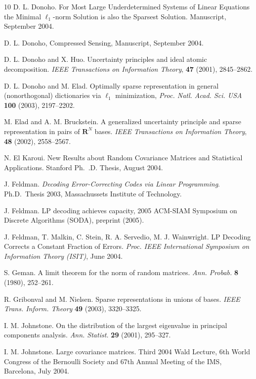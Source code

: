 \documentclass[11pt]{article}
\def\R{{{\mathbf{R}}}} %
\def\emph#1{{\it #1}} \def\textbf#1{{\bf #1}}
\newcommand{\<}{\langle}
\renewcommand{\>}{\rangle}
\numberwithin{equation}{section}
\begin{document}
\begin{thebibliography}{10}
 D. L. Donoho. For Most Large Underdetermined
  Systems of Linear Equations the Minimal $\ell_1$-norm Solution is
  also the Sparsest Solution. Manuscript, September 2004.

 D. L. Donoho, Compressed Sensing,
  Manuscript, September 2004.
  
 D. L. Donoho and X. Huo. Uncertainty principles and
  ideal atomic decomposition. {\em IEEE Transactions on Information
    Theory}, \textbf{47} (2001), 2845--2862.
  
 D. L. Donoho and M. Elad. Optimally sparse
  representation in general (nonorthogonal) dictionaries via $\ell_1$
  minimization,  {\em Proc. Natl. Acad. Sci. USA} \textbf{100} (2003),
  2197--2202. 

 M. Elad and A. M. Bruckstein. A generalized
  uncertainty principle and sparse representation in pairs of $\R^N$
  bases. {\em IEEE Transactions on Information Theory}, \textbf{48}
  (2002), 2558--2567.
  
 N. El Karoui. {New Results about Random
    Covariance Matrices and Statistical Applications}. Stanford
  Ph.~.D.  Thesis, August 2004.
  
 J. Feldman. \emph{Decoding Error-Correcting
    Codes via Linear Programming}. Ph.D.~Thesis 2003, Massachussets
  Institute of Technology.
  
 J. Feldman. LP decoding achieves capacity, 2005
  ACM-SIAM Symposium on Discrete Algorithms (SODA), preprint (2005).
  
 J. Feldman, T. Malkin, C. Stein, R. A. Servedio,
  M. J. Wainwright. LP Decoding Corrects a Constant Fraction of
  Errors. {\em Proc. IEEE International Symposium on Information
    Theory (ISIT)}, June 2004.
  
 S. Geman.  A limit theorem for the norm of random
  matrices.  {\em Ann. Probab.}  {\bf 8} (1980), 252--261.

 R. Gribonval and M. Nielsen. Sparse
  representations in unions of bases. {\em IEEE Trans. Inform. Theory}
  {\bf 49} (2003), 3320--3325. 
  
 I. M. Johnstone. On the distribution of the
  largest eigenvalue in principal components analysis. {\em Ann.
    Statist.}  {\bf 29 } (2001), 295--327.
  
 I. M. Johnstone. Large covariance matrices. Third
  2004 Wald Lecture, 6th World Congress of the Bernoulli Society and
  67th Annual Meeting of the IMS, Barcelona, July 2004.
  

\end{thebibliography}
\end{document}
